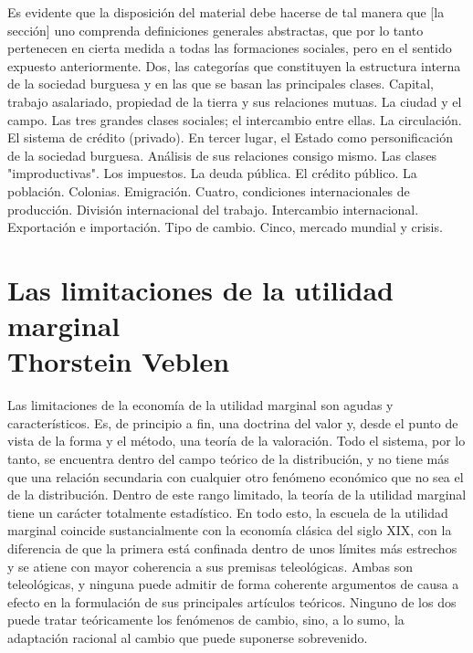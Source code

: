 Es evidente que la disposición del material debe hacerse de tal manera que [la sección] uno comprenda definiciones generales abstractas, que por lo tanto pertenecen en cierta medida a todas las formaciones sociales, pero en el sentido expuesto anteriormente. Dos, las categorías que constituyen la estructura interna de la sociedad burguesa y en las que se basan las principales clases. Capital, trabajo asalariado, propiedad de la tierra y sus relaciones mutuas. La ciudad y el campo. Las tres grandes clases sociales; el intercambio entre ellas. La circulación. El sistema de crédito (privado). En tercer lugar, el Estado como personificación de la sociedad burguesa. Análisis de sus relaciones consigo mismo. Las clases "improductivas". Los impuestos. La deuda pública. El crédito público. La población. Colonias. Emigración. Cuatro, condiciones internacionales de producción. División internacional del trabajo. Intercambio internacional. Exportación e importación. Tipo de cambio. Cinco, mercado mundial y crisis.


\chapter{Las limitaciones de la utilidad marginal \\ Thorstein Veblen}

Las limitaciones de la economía de la utilidad marginal son agudas y característicos. Es, de principio a fin, una doctrina del valor y, desde el punto de vista de la forma y el método, una teoría de la valoración. Todo el sistema, por lo tanto, se encuentra dentro del campo teórico de la distribución, y no tiene más que una relación secundaria con cualquier otro fenómeno económico que no sea el de la distribución. Dentro de este rango limitado, la teoría de la utilidad marginal tiene un carácter totalmente estadístico. En todo esto, la escuela de la utilidad marginal coincide sustancialmente con la economía clásica del siglo XIX, con la diferencia de que la primera está confinada dentro de unos límites más estrechos y se atiene con mayor coherencia a sus premisas teleológicas. Ambas son teleológicas, y ninguna puede admitir de forma coherente argumentos de causa a efecto en la formulación de sus principales artículos teóricos. Ninguno de los dos puede tratar teóricamente los fenómenos de cambio, sino, a lo sumo, la adaptación racional al cambio que puede suponerse sobrevenido.\\

